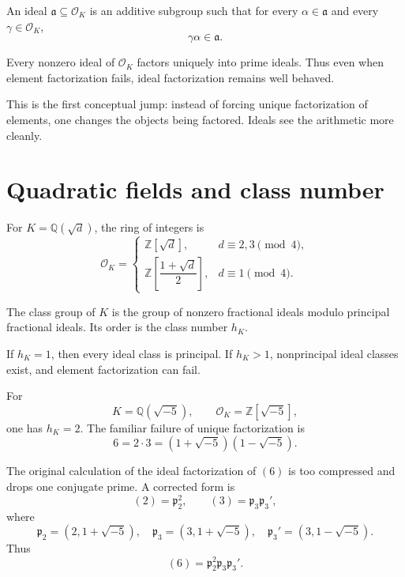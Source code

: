 \begin{definition}
An ideal \(\mathfrak a\subseteq\mathcal O_K\) is an additive subgroup such that for every \(\alpha\in\mathfrak a\) and every \(\gamma\in\mathcal O_K\),
\[
  \gamma\alpha\in\mathfrak a.
\]
\end{definition}

Every nonzero ideal of \(\mathcal O_K\) factors uniquely into prime ideals.  Thus even when element factorization fails, ideal factorization remains well behaved.

\begin{remark}
This is the first conceptual jump: instead of forcing unique factorization of elements, one changes the objects being factored.  Ideals see the arithmetic more cleanly.
\end{remark}

\section{Quadratic fields and class number}

For \(K=\mathbb Q(\sqrt d)\), the ring of integers is
\[
  \mathcal O_K=
  \begin{cases}
    \mathbb Z[\sqrt d],& d\equiv2,3\pmod4,\\
    \mathbb Z\left[\dfrac{1+\sqrt d}{2}\right],& d\equiv1\pmod4.
  \end{cases}
\]

\begin{definition}
The class group of \(K\) is the group of nonzero fractional ideals modulo principal fractional ideals.  Its order is the class number \(h_K\).
\end{definition}

If \(h_K=1\), then every ideal class is principal.  If \(h_K>1\), nonprincipal ideal classes exist, and element factorization can fail.

\begin{example}
For
\[
  K=\mathbb Q(\sqrt{-5}),\qquad \mathcal O_K=\mathbb Z[\sqrt{-5}],
\]
one has \(h_K=2\).  The familiar failure of unique factorization is
\[
  6=2\cdot3=(1+\sqrt{-5})(1-\sqrt{-5}).
\]
\end{example}

\begin{caution}
The original calculation of the ideal factorization of \((6)\) is too compressed and drops one conjugate prime.  A corrected form is
\[
  (2)=\mathfrak p_2^2,
  \qquad
  (3)=\mathfrak p_3\mathfrak p_3',
\]
where
\[
  \mathfrak p_2=(2,1+\sqrt{-5}),
  \quad
  \mathfrak p_3=(3,1+\sqrt{-5}),
  \quad
  \mathfrak p_3'=(3,1-\sqrt{-5}).
\]
Thus
\[
  (6)=\mathfrak p_2^2\mathfrak p_3\mathfrak p_3'.
\]
\end{caution}


